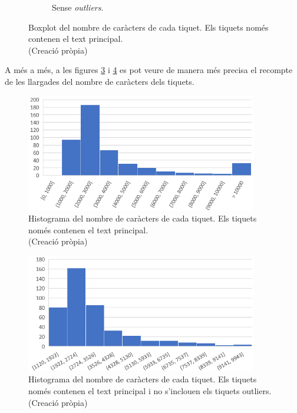 \begin{figure}[H]
\begin{subfigure}{.5\textwidth}
      \caption{Sense \textit{outliers}.}
      \label{fig:boxplot_num_chars_tiquets_outliers}
    \end{subfigure}
    \caption[Boxplot dels caràcters del text principal de cada tiquet]{Boxplot del nombre de caràcters de cada tiquet. Els tiquets només contenen el text principal. \\ (Creació pròpia)}
    \label{fig:boxplot_num_chars_tiquets_dos}
\end{figure}

A més a més, a les figures \ref{fig:histograma_num_chars_tiquets} i \ref{fig:histograma_num_chars_tiquets_outliers} es pot veure de manera més precisa el recompte de les llargades del nombre de caràcters dels tiquets.

\begin{figure}[H]
    \centering
    \includegraphics[width=0.9\textwidth]{histograma_num_chars_tiquets.png}
    \caption[Histograma dels caràcters del text principal de cada tiquet]{Histograma del nombre de caràcters de cada tiquet. Els tiquets només contenen el text principal. \\ (Creació pròpia)}
    \label{fig:histograma_num_chars_tiquets}
\end{figure}


\begin{figure}[H]
    \centering
    \includegraphics[width=0.9\textwidth]{histograma_num_chars_tiquets_outliers.png}
    \caption[Histograma dels caràcters del text principal de cada tiquet sense outliers]{Histograma del nombre de caràcters de cada tiquet. Els tiquets només contenen el text principal i no s'inclouen els tiquets outliers. \\ (Creació pròpia)}
    \label{fig:histograma_num_chars_tiquets_outliers}
\end{figure}

